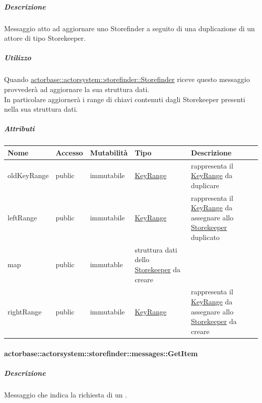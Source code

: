 \documentclass{scalatekids-article}
\begin{document}
\subparagraph{Descrizione}
Messaggio atto ad aggiornare uno Storefinder a seguito di una duplicazione
di un attore di tipo Storekeeper.\\

\subparagraph{Utilizzo}
Quando \hyperref[sec:actorbase::actorsystem::storefinder::Storefinder]{actorbase::\allowbreak{}actorsystem::\allowbreak{}storefinder::\allowbreak{}Storefinder}
riceve questo messaggio provvederà ad aggiornare la sua struttura dati.\\In
particolare aggiornerà i range di chiavi contenuti dagli Storekeeper presenti
nella sua struttura dati.

\subparagraph{Attributi}  %
\begin{tabular}{| p{3cm} | p{1.5cm} | p{2cm} | p{2cm} | p{8.5cm} |}
  \hline
  Nome & Accesso & Mutabilità & Tipo & Descrizione\\
  \hline
  oldKeyRange & public & immutabile & \hyperref[sec:actorbase::actorsystem::utils::KeyRange]{KeyRange} & rappresenta il \hyperref[sec:actorbase::actorsystem::utils::KeyRange]{KeyRange} da duplicare\\
  \hline
  leftRange & public & immutabile & \hyperref[sec:actorbase::actorsystem::utils::KeyRange]{KeyRange} & rappresenta il \hyperref[sec:actorbase::actorsystem::utils::KeyRange]{KeyRange} da assegnare allo \hyperref[sec:actorbase::actorsystem::storekeeper::Storekeeper]{Storekeeper} duplicato \\
  \hline
  map & public & immutable & struttura dati dello \hyperref[sec:actorbase::actorsystem::storekeeper::Storekeeper]{Storekeeper} da creare\\
  \hline
  rightRange & public & immutabile & \hyperref[sec:actorbase::actorsystem::utils::KeyRange]{KeyRange} & rappresenta il \hyperref[sec:actorbase::actorsystem::utils::KeyRange]{KeyRange} da assegnare allo \hyperref[sec:actorbase::actorsystem::storekeeper::Storekeeper]{Storekeeper} da creare\\
  \hline
\end{tabular}


\paragraph{actorbase::actorsystem::storefinder::messages::GetItem}
\label{sec:actorbase::actorsystem::storefinder::messages::GetItem}

\subparagraph{Descrizione}

Messaggio che indica la richiesta di un .
\end{document}
